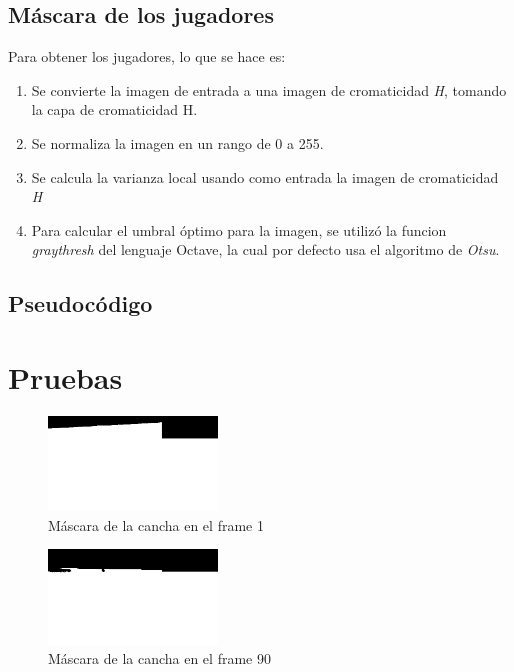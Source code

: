 \documentclass{IEEEtran}
\begin{document}
\subsection{M\'ascara de los jugadores}

Para obtener los jugadores, lo que se hace es:

\begin{enumerate}
\item Se convierte la imagen de entrada a una imagen de cromaticidad \emph{H}, tomando la capa de cromaticidad H.
\item Se normaliza la imagen en un rango de 0 a 255.
\item Se calcula la varianza local usando como entrada la imagen de cromaticidad \emph{H}
\item Para calcular el umbral \'optimo para la imagen, se utiliz\'o la funcion \emph{graythresh} del lenguaje Octave, la cual por defecto usa el algoritmo de \emph{Otsu}.
\end{enumerate}

\subsection{Pseudoc\'odigo}



\section{Pruebas}

\begin{figure}[!ht]
  \caption{M\'ascara de la cancha en el frame 1}
  \centering
    \includegraphics[width=0.4\textwidth]{frameCancha.png}
\end{figure}

\begin{figure}[!ht]
  \caption{M\'ascara de la cancha en el frame 90}
  \centering
    \includegraphics[width=0.4\textwidth]{frameCancha90.png}
\end{figure}
\end{document}
